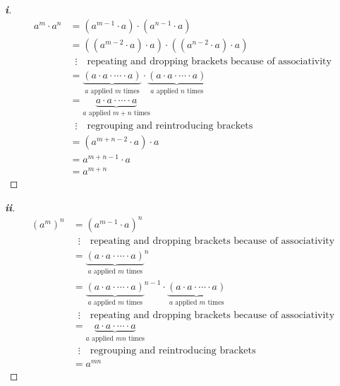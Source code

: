 \documentclass[../main.tex]{subfiles}
\begin{document}
\begin{proof}[\textbf{i}]
  \begin{align*}
    a^{m} \cdot a^{n} &= (a^{m - 1} \cdot a) \cdot (a^{n - 1} \cdot a) \\
                      &= ((a^{m - 2} \cdot a) \cdot a) \cdot ((a^{n - 2} \cdot a) \cdot a) \\
                      &\;\; \vdots \quad\text{repeating and dropping brackets because of associativity} \\
                      &= \underbrace{(a \cdot a \cdot \cdots \cdot a)}_{\text{$a$ applied $m$ times}} \cdot \underbrace{(a \cdot a \cdot \cdots \cdot a)}_{\text{$a$ applied $n$ times}} \\
                      &= \underbrace{a \cdot a \cdot \cdots \cdot a}_{\text{$a$ applied $m + n$ times}} \\
                      &\; \; \vdots \quad\text{regrouping and reintroducing brackets} \\
                      &= (a^{m + n - 2} \cdot a) \cdot a \\
                      &= a^{m + n - 1} \cdot a \\
                      &= a^{m + n}
  \end{align*}
\end{proof}
\begin{proof}[\textbf{ii}]
  \begin{align*}
    (a^{m})^{n} &= (a^{m - 1} \cdot a)^{n} \\
                &\; \; \vdots \quad\text{repeating and dropping brackets because of associativity}\\
                &= {\underbrace{(a \cdot a \cdot \cdots \cdot a)}_{\text{$a$ applied $m$ times}}}^{n} \\
                &= {\underbrace{(a \cdot a \cdot \cdots \cdot a)}_{\text{$a$ applied $m$ times}}}^{n - 1} \cdot \underbrace{(a \cdot a \cdot \cdots \cdot a)}_{\text{$a$ applied $m$ times}} \\
                &\; \; \vdots \quad\text{repeating and dropping brackets because of associativity}\\
                &= \underbrace{a \cdot a \cdot \cdots \cdot a}_{\text{$a$ applied $mn$ times}} \\
                &\; \; \vdots \quad\text{regrouping and reintroducing brackets} \\
                &= a^{mn}
  \end{align*}
\end{proof}
\end{document}
